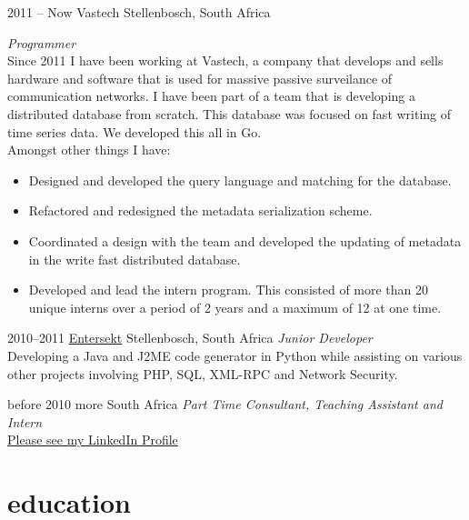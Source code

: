\documentclass[]{friggeri-cv} %
\begin{document}
\begin{entrylist}

\entry
{2011 -- Now}
{Vastech}
{Stellenbosch, South Africa}
{\emph{Programmer} \\
Since 2011 I have been working at Vastech, a company that develops and sells hardware and software that is used for massive passive surveilance of communication networks. I have been part of a team that is developing a distributed database from scratch. This database was focused on fast writing of time series data.  We developed this all in Go. \\
Amongst other things I have: \\
\begin{itemize}
\item Designed and developed the query language and matching for the database.
\item Refactored and redesigned the metadata serialization scheme.
\item Coordinated a design with the team and developed the updating of metadata in the write fast distributed database.
\item Developed and lead the intern program. This consisted of more than 20 unique interns over a period of 2 years and a maximum of 12 at one time.
\end{itemize}
}

\entry
{2010--2011}
{\href{https://www.entersekt.com/}{Entersekt}}
{Stellenbosch, South Africa}
{\emph{Junior Developer} \\
Developing a Java and J2ME code generator in Python while assisting on various other projects involving PHP, SQL, XML-RPC and Network Security.}

\entry
{before 2010}
{more}
{South Africa}
{\emph{Part Time Consultant, Teaching Assistant and Intern} \\
\href{https://za.linkedin.com/in/schulzewalter}{Please see my LinkedIn Profile}
}

\end{entrylist}

\section{education}
\end{document}

